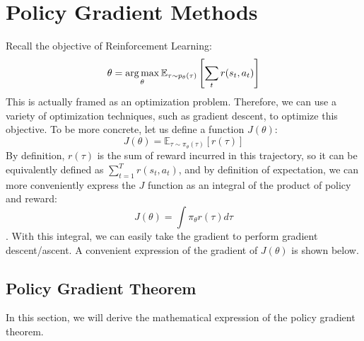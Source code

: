 \chapter{Policy Gradient Methods}
Recall the objective of Reinforcement Learning:
$$\theta = \operatorname*{arg\,max}_\theta\mathbb{E}_{\tau\sim p_\theta(\tau)}\left[\sum_t r(s_t,a_t)\right]$$
This is actually framed as an optimization problem. Therefore, we can use a variety of optimization techniques, such as gradient descent, to optimize this objective. To be more concrete, let us define a function $J(\theta)$:
$$J(\theta) = \mathbb{E}_{\tau\sim \pi_\theta(\tau)}[r(\tau)]$$
By definition, $r(\tau)$ is the sum of reward incurred in this trajectory, so it can be equivalently defined as $\sum_{t=1}^T r(s_t,a_t)$, and by definition of expectation, we can more conveniently express the $J$ function as an integral of the product of policy and reward:
$$J(\theta) = \int \pi_\theta r(\tau)d\tau$$.
With this integral, we can easily take the gradient to perform gradient descent/ascent. A convenient expression of the gradient of $J(\theta)$ is shown below.
\section{Policy Gradient Theorem}
In this section, we will derive the mathematical expression of the policy gradient theorem.

